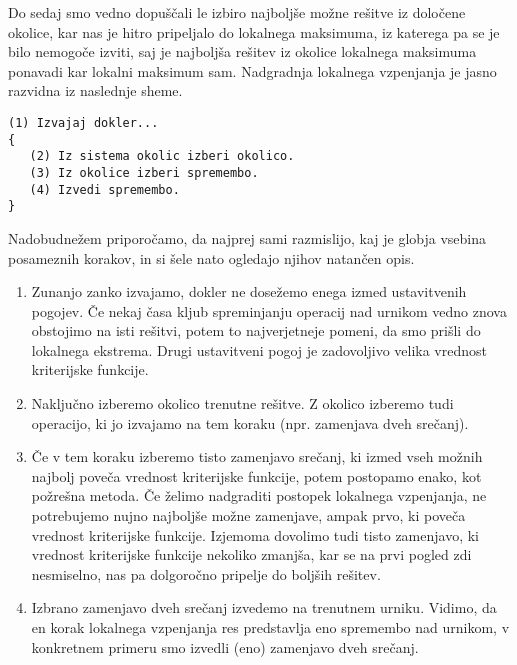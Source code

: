 \documentclass[a4paper, 10pt]{article}
\begin{document}
Do sedaj smo vedno dopuščali le izbiro najboljše možne rešitve iz določene okolice, kar nas
je hitro pripeljalo do lokalnega maksimuma, iz katerega pa se je bilo nemogoče izviti, saj
je najboljša rešitev iz okolice lokalnega maksimuma ponavadi kar lokalni maksimum sam.
Nadgradnja lokalnega vzpenjanja je jasno razvidna iz naslednje sheme.

\begin{verbatim}
(1) Izvajaj dokler...
{
   (2) Iz sistema okolic izberi okolico.
   (3) Iz okolice izberi spremembo.
   (4) Izvedi spremembo.
}
\end{verbatim}

Nadobudnežem priporočamo, da najprej sami razmislijo, kaj je globja vsebina posameznih
korakov, in si šele nato ogledajo njihov natančen opis.
\begin{enumerate}
   \item Zunanjo zanko izvajamo, dokler ne dosežemo enega izmed ustavitvenih pogojev.
   Če nekaj časa kljub spreminjanju operacij nad urnikom vedno znova obstojimo na isti
   rešitvi, potem to najverjetneje pomeni, da smo prišli do lokalnega ekstrema. Drugi
   ustavitveni pogoj je zadovoljivo velika vrednost kriterijske funkcije.

   \item Naključno izberemo okolico trenutne rešitve. Z okolico izberemo tudi operacijo,
   ki jo izvajamo na tem koraku (npr. zamenjava dveh srečanj).

   \item Če v tem koraku izberemo tisto zamenjavo srečanj, ki izmed vseh možnih najbolj
   poveča vrednost kriterijske funkcije, potem postopamo enako, kot požrešna metoda. Če
   želimo nadgraditi postopek lokalnega vzpenjanja, ne potrebujemo nujno najboljše možne
   zamenjave, ampak prvo, ki poveča vrednost kriterijske funkcije. Izjemoma dovolimo tudi
   tisto zamenjavo, ki vrednost kriterijske funkcije nekoliko zmanjša, kar se na prvi
   pogled zdi nesmiselno, nas pa dolgoročno pripelje do boljših rešitev.

   \item Izbrano zamenjavo dveh srečanj izvedemo na trenutnem urniku. Vidimo, da en korak
   lokalnega vzpenjanja res predstavlja eno spremembo nad urnikom, v konkretnem primeru
   smo izvedli (eno) zamenjavo dveh srečanj.
\end{enumerate}
\end{document}
